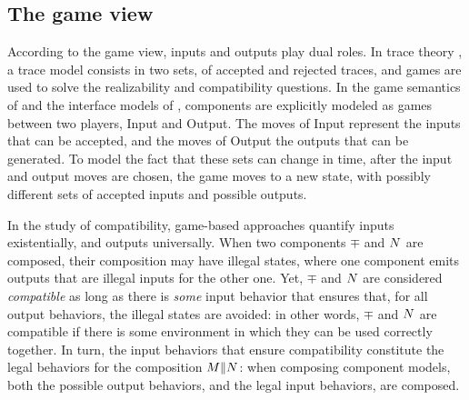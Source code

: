 \subsection{The game view} 

According to the game view, inputs and outputs play dual roles.
In trace theory \cite{DillThesis}, a trace model consists in two sets,
of accepted and rejected traces, and games are used to solve the 
realizability and compatibility questions.
In the game semantics of
\cite{Abramsky97,AbramskyTACAS97} and the interface models of 
\cite{luca-ia-01,luca-it-01}, components are explicitly 
modeled as games between two players, Input and Output. 
The moves of Input represent the inputs that can be accepted, and the
moves of Output the outputs that can be generated. 
To model the fact that these sets can change in time, after the input
and output moves are chosen, the game moves to a new state, with
possibly different sets of accepted inputs and possible outputs. 

In the study of compatibility, game-based approaches quantify inputs
existentially, and outputs universally. 
When two components $\mp$ and $N$ are composed, their composition
may have illegal states, where one component emits outputs that are
illegal inputs for the other one.
Yet, $\mp$ and $N$ are considered {\em compatible\/} as long as
there is {\em some\/} input behavior that ensures that, for all output
behaviors, the illegal states are avoided: 
in other words, $\mp$ and $N$ are compatible if there is some
environment in which they can be used correctly together.
In turn, the input behaviors that ensure compatibility constitute the
legal behaviors for the composition $M \| N$: when composing
component models, both the possible output behaviors, and the legal
input behaviors, are composed. 

